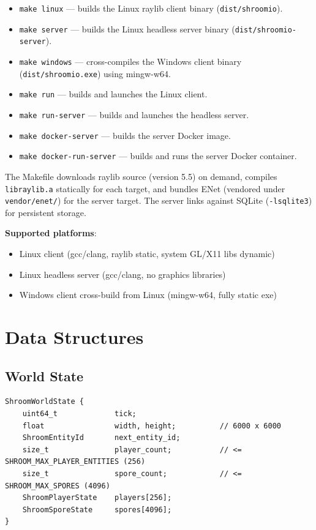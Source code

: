 \documentclass[11pt]{article}
\begin{document}
\begin{itemize}
  \item \texttt{make linux} --- builds the Linux raylib client binary (\texttt{dist/shroomio}).
  \item \texttt{make server} --- builds the Linux headless server binary (\texttt{dist/shroomio-server}).
  \item \texttt{make windows} --- cross-compiles the Windows client binary (\texttt{dist/shroomio.exe}) using mingw-w64.
  \item \texttt{make run} --- builds and launches the Linux client.
  \item \texttt{make run-server} --- builds and launches the headless server.
  \item \texttt{make docker-server} --- builds the server Docker image.
  \item \texttt{make docker-run-server} --- builds and runs the server Docker container.
\end{itemize}

The Makefile downloads raylib source (version 5.5) on demand, compiles \texttt{libraylib.a} statically for each target, and bundles ENet (vendored under \texttt{vendor/enet/}) for the server target. The server links against SQLite (\texttt{-lsqlite3}) for persistent storage.

\noindent\textbf{Supported platforms}:
\begin{itemize}
  \item Linux client (gcc/clang, raylib static, system GL/X11 libs dynamic)
  \item Linux headless server (gcc/clang, no graphics libraries)
  \item Windows client cross-build from Linux (mingw-w64, fully static exe)
\end{itemize}

\section{Data Structures}

\subsection{World State}

\begin{verbatim}
ShroomWorldState {
    uint64_t             tick;
    float                width, height;          // 6000 x 6000
    ShroomEntityId       next_entity_id;
    size_t               player_count;           // <= SHROOM_MAX_PLAYER_ENTITIES (256)
    size_t               spore_count;            // <= SHROOM_MAX_SPORES (4096)
    ShroomPlayerState    players[256];
    ShroomSporeState     spores[4096];
}
\end{verbatim}
\end{document}
